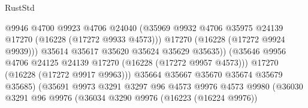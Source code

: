 \begin{lexlean}{RustStd}
\begin{coremodule}
                                              @9946
                                              @4700
                                              @9923
                                              @4706
                                              @24040
                                              (@35969
                                                @9932
                                                @4706
                                                @35975
                                                @24139
                                                @17270
                                                (@16228 (@17272 @9933 @4573)))
                                              @17270
                                              (@16228 (@17272 @9924 @9939)))
                                            @35614
                                            @35617
                                            @35620
                                            @35624
                                            @35629
                                            @35635))
                                        (@35646
                                          @9956
                                          @4706
                                          @24125
                                          @24139
                                          @17270
                                          (@16228 (@17272 @9957 @4573)))
                                        @17270
                                        (@16228 (@17272 @9917 @9963)))
                                      @35664
                                      @35667
                                      @35670
                                      @35674
                                      @35679
                                      @35685)
                                    (@35691
                                      @9973
                                      @3291
                                      @3297
                                      @96
                                      @4573
                                      @9976
                                      @4573
                                      @9980
                                      (@36030
                                        @3291
                                        @96
                                        @9976
                                        (@36034
                                          @3290
                                          @9976
                                          (@16223 (@16224 @9976))

\end{coremodule}
\end{lexlean}
